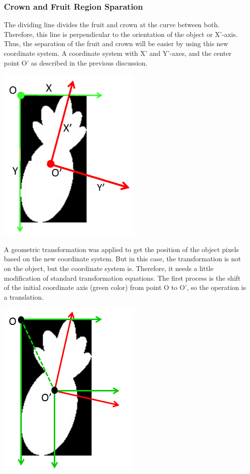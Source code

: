 \documentclass[11pt]{article}
\begin{document}
\begin{linenumbers}
\subsubsection{Crown and Fruit Region Sparation}
The dividing line divides the fruit and crown at the curve between both. Therefore, this line is perpendicular to the orientation of the object or X'-axis. Thus, the separation of the fruit and crown will be easier by using this new coordinate system. A coordinate system with X' and Y'-axes, and the center point O' as described in the previous discussion.
\begin{center}
	\includegraphics[scale=0.4]{images/two-coordinate-systems}
\end{center}
 A geometric transformation was applied to get the position of the object pixels based on the new coordinate system. But in this case, the transformation is not on the object, but the coordinate system is. Therefore, it needs a little modification of standard transformation equations. The first process is the shift of the initial coordinate axis (green color) from point O to O', so the operation is a translation.
\begin{center}
	\includegraphics[scale=0.4]{images/translation}

\end{center}
\end{linenumbers}
\end{document}

